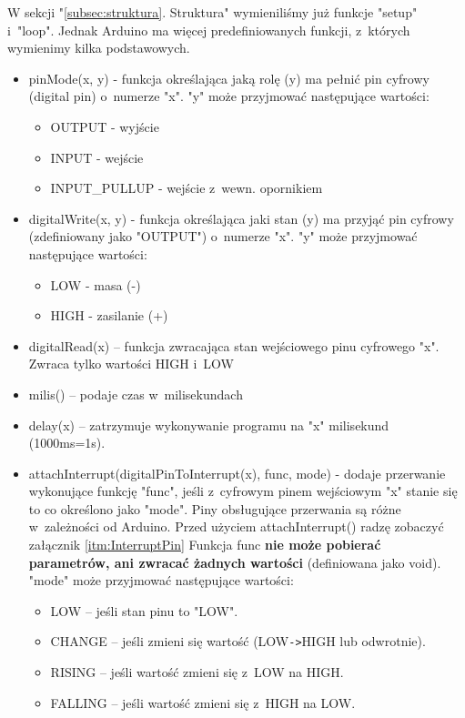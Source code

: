 \documentclass[a4paper,12pt, twoside]{article}
\begin{document}
	W sekcji "\ref{subsec:struktura}. Struktura" wymieniliśmy już funkcje "setup" i~"loop". Jednak Arduino ma więcej predefiniowanych funkcji, z~których wymienimy kilka podstawowych.
	\begin{itemize}
		\item pinMode(x, y) - funkcja określająca jaką rolę (y) ma pełnić pin cyfrowy (digital pin) o~numerze "x". "y" może przyjmować następujące wartości:
			\begin{itemize}
				\item OUTPUT - wyjście
				\item INPUT - wejście
				\item INPUT\_PULLUP - wejście z~wewn. opornikiem
			\end{itemize}
		\item digitalWrite(x, y) - funkcja określająca jaki stan (y) ma przyjąć pin cyfrowy (zdefiniowany jako "OUTPUT") o~numerze "x". "y" może przyjmować następujące wartości:
			\begin{itemize}
				\item LOW - masa (-)
				\item HIGH - zasilanie (+)
			\end{itemize}
		\item digitalRead(x) -- funkcja zwracająca stan wejściowego pinu cyfrowego "x". Zwraca tylko wartości HIGH i~LOW
		\item milis() -- podaje czas w~milisekundach
		\item delay(x) -- zatrzymuje wykonywanie programu na "x" milisekund (1000ms=1s).
		\item attachInterrupt(digitalPinToInterrupt(x), func, mode) - dodaje przerwanie wykonujące funkcję "func", jeśli z~cyfrowym pinem wejściowym "x" stanie się to co określono jako "mode". Piny obsługujące przerwania są różne w~zależności od Arduino. Przed użyciem attachInterrupt() radzę zobaczyć załącznik \ref{itm:InterruptPin} Funkcja func \textbf{nie może pobierać parametrów, ani zwracać żadnych wartości} (definiowana jako void). "mode" może przyjmować następujące wartości:
			\begin{itemize}
				\item LOW -- jeśli stan pinu to "LOW".
				\item CHANGE -- jeśli zmieni się wartość (LOW\verb|->|HIGH lub odwrotnie).
				\item RISING -- jeśli wartość zmieni się z~LOW na HIGH.
				\item FALLING -- jeśli wartość zmieni się z~HIGH na LOW.
			\end{itemize}

\end{itemize}
\end{document}
